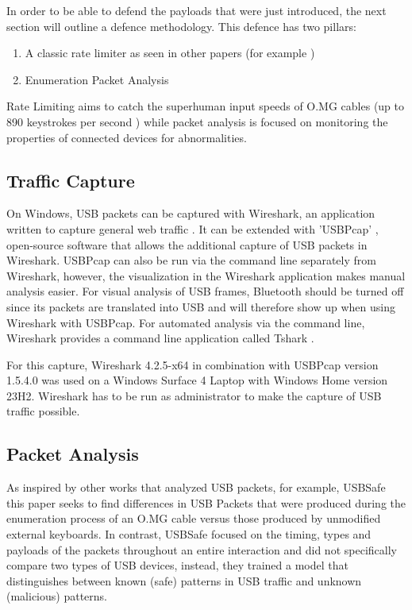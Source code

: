 In order to be able to defend the payloads that were just introduced, the next section will outline a defence methodology.
This defence has two pillars:
\begin{enumerate}
    \item A classic rate limiter as seen in other papers (for example \cite{neunerUSBlockBlockingUSBBased2018} )
    \item Enumeration Packet Analysis
\end{enumerate}

Rate Limiting aims to catch the superhuman input speeds of O.MG cables (up to 890 keystrokes per second \cite{hak5MGCable}) while packet analysis is focused on monitoring the properties of connected devices for abnormalities.


\subsection{Traffic Capture} \label{Traffic Capture}

On Windows, USB packets can be captured with Wireshark, an application written to capture general web traffic \cite{WiresharkGoDeep}. It can be extended with 'USBPcap' \cite{USBPcap}, open-source software that allows the additional capture of USB packets in Wireshark. USBPcap can also be run via the command line separately from Wireshark, however, the visualization in the Wireshark application makes manual analysis easier. For visual analysis of USB frames, Bluetooth should be turned off since its packets are translated into USB and will therefore show up when using Wireshark with USBPcap. For automated analysis via the command line, Wireshark provides a command line application called Tshark \cite{TsharkTsharkDev}. 

For this capture, Wireshark 4.2.5-x64 in combination with USBPcap version 1.5.4.0 was used on a Windows Surface 4 Laptop with Windows Home version 23H2. Wireshark has to be run as administrator to make the capture of USB traffic possible.


\subsection{Packet Analysis}\label{Packet Analysis}


As inspired by other works that analyzed USB packets, for example, USBSafe \cite{kharrazUSBESAFEEndPointSolution2019} this paper seeks to find differences in USB Packets that were produced during the enumeration process of an O.MG cable versus those produced by unmodified external keyboards. In contrast, USBSafe focused on the timing, types and payloads of the packets throughout an entire interaction and did not specifically compare two types of USB devices, instead, they trained a model that distinguishes between known (safe) patterns in USB traffic and unknown (malicious) patterns. 

